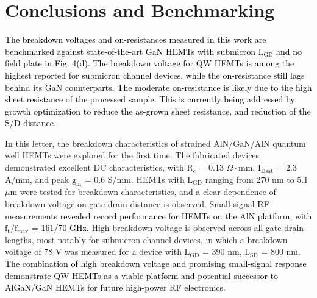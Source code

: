 \documentclass[journal]{IEEEtran}
\begin{document}
\section{Conclusions and Benchmarking}
\textcolor{black}{The breakdown voltages and on-resistances measured in this work are benchmarked against state-of-the-art GaN HEMTs with submicron $\mathrm{L_{GD}}$ and no field plate \cite{Shinohara2010,Shinohara2011,Shinohara2011a,Tang2015,Chung2010,Palacios2006,Saunier2012,Snider2012,Guo2013,Lee2013,Dasgupta2009,Nidhi2012,Denninghoff2012,Denninghoff2012a,Denninghoff2013,Romanczyk2018} in Fig. 4(d). The breakdown voltage for QW HEMTs is among the highest reported for submicron channel devices, while the on-resistance still lags behind its GaN counterparts. The moderate on-resistance is likely due to the high sheet resistance of the processed sample. This is currently being addressed by growth optimization to reduce the as-grown sheet resistance, and reduction of the S/D distance.}

In this letter, the breakdown characteristics of strained AlN/GaN/AlN quantum well HEMTs were explored for the first time. The fabricated devices demonstrated excellent DC characteristics, with $\mathrm{R_c}$ = 0.13 $\Omega\cdot$mm, $\mathrm{I_{Dsat}}$ = 2.3 A/mm, and peak $\mathrm{g_m}$ = 0.6 S/mm. HEMTs with $\mathrm{L_{GD}}$ ranging from 270 nm to 5.1 $\mu$m were tested for breakdown characteristics, and a clear dependence of breakdown voltage on gate-drain distance is observed. \textcolor{black}{Small-signal RF measurements revealed record performance for HEMTs on the AlN platform, with $\mathrm{f_t/f_{max}}$ = 161/70 GHz.} High breakdown voltage is observed across all gate-drain lengths, most notably for submicron channel devices, in which a breakdown voltage of 78 V was measured for a device with $\mathrm{L_{GD}}$ = 390 nm, $\mathrm{L_{SD}}$ = 800 nm. \textcolor{black}{The combination of high breakdown voltage and promising small-signal response demonstrate QW HEMTs as a viable platform and potential successor to AlGaN/GaN HEMTs for future high-power RF electronics.}

\vfill

{\color{white}
\pagebreak
}


%


\end{document}
